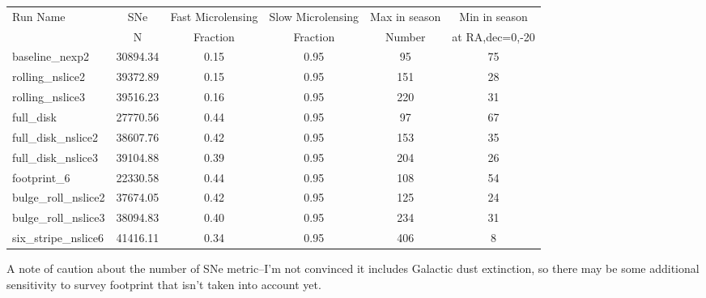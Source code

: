 \documentclass[modern]{aastex62}
\begin{document}
\begin{table}
\begin{tabular}{lccccc}\label{tab:metrics}

 Run Name &  SNe &  Fast Microlensing &  Slow Microlensing &  Max in season &  Min in season \\
 &           N    & Fraction  & Fraction     &   Number & at RA,dec=0,-20 \\
\toprule

baseline\_nexp2 &             30894.34 &                    0.15 &                    0.95 &     95 &     75 \\
rolling\_nslice2 &             39372.89 &                    0.15 &                    0.95 &    151 &     28 \\
rolling\_nslice3 &             39516.23 &                    0.16 &                    0.95 &    220 &     31 \\


\hline
full\_disk &             27770.56 &                    0.44 &                    0.95 &     97 &     67 \\
full\_disk\_nslice2 &             38607.76 &                    0.42 &                    0.95 &    153 &     35 \\
full\_disk\_nslice3 &             39104.88 &                    0.39 &                    0.95 &    204 &     26 \\
                                
                                   
\hline
footprint\_6 &             22330.58 &                    0.44 &                    0.95 &    108 &     54 \\
bulge\_roll\_nslice2 &             37674.05 &                    0.42 &                    0.95 &    125 &     24 \\
bulge\_roll\_nslice3 &             38094.83 &                    0.40 &                    0.95 &    234 &     31 \\
six\_stripe\_nslice6 &             41416.11 &                    0.34 &                    0.95 &    406 &      8 \\
\hline
\end{tabular}
\end{table}

A note of caution about the number of SNe metric--I'm not convinced it includes Galactic dust extinction, so there may be some additional sensitivity to survey footprint that isn't taken into account yet.
\end{document}
